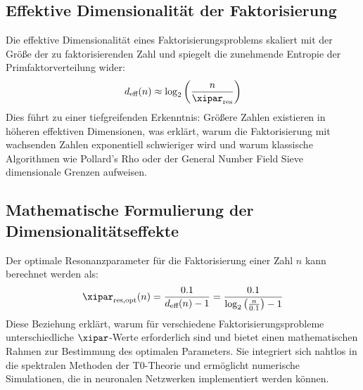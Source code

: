 \subsection{Effektive Dimensionalität der Faktorisierung}
\label{subsec:effective_dimensionality}
Die effektive Dimensionalität eines Faktorisierungsproblems skaliert mit der Größe der zu faktorisierenden Zahl und spiegelt die zunehmende Entropie der Primfaktorverteilung wider:
\begin{equation}
	d_{\text{eff}}(n) \approx \log_2\left(\frac{n}{\xipar_{\text{res}}}\right)
\end{equation}
Dies führt zu einer tiefgreifenden Erkenntnis: Größere Zahlen existieren in höheren effektiven Dimensionen, was erklärt, warum die Faktorisierung mit wachsenden Zahlen exponentiell schwieriger wird und warum klassische Algorithmen wie Pollard's Rho oder der General Number Field Sieve dimensionale Grenzen aufweisen.
\begin{table}[htbp]
	\centering
	\caption{Effektive Dimensionen und optimale Resonanzparameter, erweitert um RSA-Vergleiche}
	\label{tab:effective_dimensions}
\end{table}
\subsection{Mathematische Formulierung der Dimensionalitätseffekte}
\label{subsec:mathematical_formulation}
Der optimale Resonanzparameter für die Faktorisierung einer Zahl $n$ kann berechnet werden als:
\begin{equation}
	\xipar_{\text{res,opt}}(n) = \frac{0.1}{d_{\text{eff}}(n)-1} = \frac{0.1}{\log_2\left(\frac{n}{0.1}\right)-1}
\end{equation}
Diese Beziehung erklärt, warum für verschiedene Faktorisierungsprobleme unterschiedliche $\xipar$-Werte erforderlich sind und bietet einen mathematischen Rahmen zur Bestimmung des optimalen Parameters. Sie integriert sich nahtlos in die spektralen Methoden der T0-Theorie und ermöglicht numerische Simulationen, die in neuronalen Netzwerken implementiert werden können.
